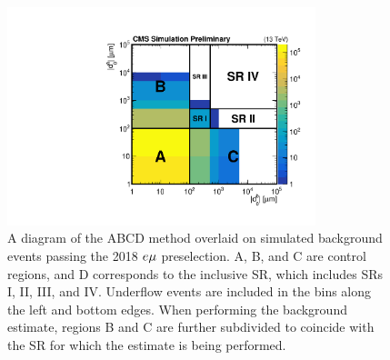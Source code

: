 \begin{figure}
\centering
\includegraphics[width=0.8\textwidth]{figures/bg/abcdMethod_CMSPreliminary.pdf}
\caption{A diagram of the ABCD method overlaid on simulated background events passing the 2018 $e{\mu}$ preselection. A, B, and C are control regions, and D corresponds to the inclusive SR, which includes SRs I, II, III, and IV. Underflow events are included in the bins along the left and bottom edges. When performing the background estimate, regions B and C are further subdivided to coincide with the SR for which the estimate is being performed.}
\label{abcd_regions}
\end{figure}